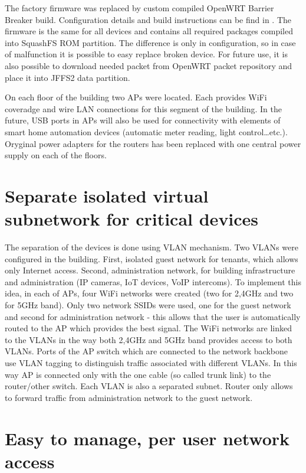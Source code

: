 \documentclass{llncs}
\begin{document}
The factory firmware was replaced by custom compiled OpenWRT Barrier Breaker build. Configuration details and build instructions can be find in \cite{GitHub}. The firmware is the same for all devices and contains all required packages compiled into SquashFS ROM partition. The difference is only in configuration, so in case of malfunction it is possible to easy replace broken device. For future use, it is also possible to download needed packet from OpenWRT packet repository and place it into JFFS2 data partition.

On each floor of the building two APs were located. Each provides WiFi coveradge and wire LAN connections for this segment of the building. In the future, USB ports in APs will also be used for connectivity with elements of smart home automation devices (automatic meter reading, light control\ldots etc.). Oryginal power adapters for the routers has been replaced with one central power supply on each of the floors. 

\section{Separate isolated virtual subnetwork for critical devices}
The separation of the devices is done using VLAN mechanism. Two VLANs were configured in the building. First, isolated guest network for tenants, which allows only Internet access. Second, administration network, for building infrastructure and administration (IP cameras, IoT devices, VoIP intercoms). To implement this idea, in each of APs, four WiFi networks were created (two for 2,4GHz and two for 5GHz band). Only two network SSIDs were used, one for the guest network and second for administration network - this allows that the user is automatically routed to the AP which provides the best signal. The WiFi networks are linked to the VLANs in the way both 2,4GHz and 5GHz band provides access to both VLANs. Ports of the AP switch which are connected to the network backbone use VLAN tagging to distinguish traffic associated with different VLANs. In this way AP is connected only with the one cable (so called trunk link) to the router/other switch. Each VLAN is also a separated subnet. Router only allows to forward traffic from administration network to the guest network.

\section{Easy to manage, per user network access}
\end{document}
